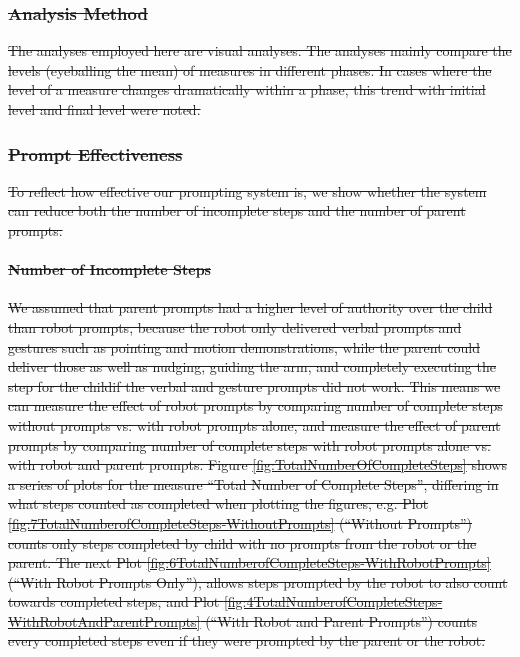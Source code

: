 \documentclass{ut-thesis}
\providecommand{\DIFdeltex}[1]{{\protect\color{red}\sout{#1}}}                      %
\providecommand{\DIFdel}[1]{\texorpdfstring{\DIFdeltex{#1}}{}} %
\begin{document}
\subsubsection{\DIFdel{Analysis Method}}
\addtocounter{subsubsection}{-1}%
\DIFdel{The analyses employed here are visual analyses.  The analyses mainly compare the levels (eyeballing the mean) of measures in different phases.  In cases where the level of a measure changes dramatically within a phase, this trend with initial level and final level were noted.  }%

\subsubsection{\DIFdel{Prompt Effectiveness}}
\addtocounter{subsubsection}{-1}%
\DIFdel{To reflect how effective our prompting system is, we show whether the system can reduce both the number of incomplete steps and the number of parent prompts.
}%

\paragraph{\DIFdel{Number of Incomplete Steps}}
\addtocounter{paragraph}{-1}%
\DIFdel{We assumed that parent prompts had a higher level of authority over the child than robot prompts, because the robot only delivered verbal prompts and gestures such as pointing and motion demonstrations, while the parent could deliver those as well as nudging, guiding the arm, and completely executing the step for the childif the verbal and gesture prompts did not work.  This means we can measure the effect of robot prompts by comparing number of complete steps without prompts vs. with robot prompts alone, and measure the effect of parent prompts by comparing number of complete steps with robot prompts alone vs. with robot and parent prompts.  Figure \ref{fig:TotalNumberOfCompleteSteps} shows a series of plots for the measure ``Total Number of Complete Steps'', differing in what steps counted as completed when plotting the figures, e.g. Plot \ref{fig:7TotalNumberofCompleteSteps-WithoutPrompts} (``Without Prompts'') counts only steps completed by child with no prompts from the robot or the parent.  The next Plot \ref{fig:6TotalNumberofCompleteSteps-WithRobotPrompts} (``With Robot Prompts Only''), allows steps prompted by the robot to also count towards completed steps, and Plot \ref{fig:4TotalNumberofCompleteSteps-WithRobotAndParentPrompts} (``With Robot and Parent Prompts'') counts every completed steps even if they were prompted by the parent or the robot.  }%
\end{document}
